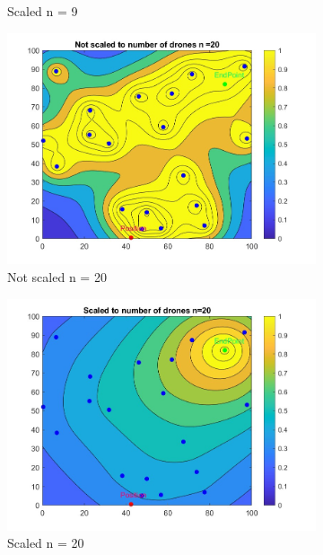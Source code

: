 \begin{figure}[h]
\begin{subfigure}[b]{0.43\textwidth}
         \caption{Scaled n = 9}
         \end{subfigure}
         \hfill 
         \begin{subfigure}[b]{0.43\textwidth}
         \centering
         \includegraphics[width=\textwidth]{figures/RewardFunctionNotscaled20.jpg}
         \caption{Not scaled n = 20}
         \end{subfigure}
         \begin{subfigure}[b]{0.43\textwidth}
         \centering
         \includegraphics[width=\textwidth]{figures/RewardFunctionscaled20.jpg}
         \caption{Scaled n = 20}
         \end{subfigure}
         \hfill
          \begin{subfigure}[b]{0.43\textwidth}

\end{subfigure}
\end{figure}
